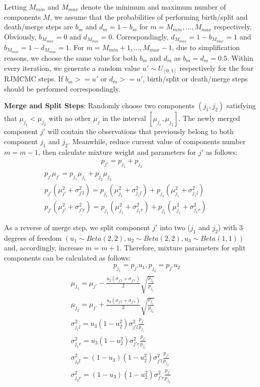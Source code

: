 \documentclass[conference]{IEEEtran}
\begin{document}
Letting $M_{min}$ and $M_{max}$ denote the minimum and maximum number of components $M$, we assume that the probabilities of performing birth/split and death/merge steps are $b_m$ and $d_m = 1 - b_m$ for $m = M_{min},\dots,M_{max}$ respectively. Obviously, $b_{M_{max}}=0$ and $d_{M_{min}}=0$. Correspondingly, $d_{M_{max}}=1-b_{M_{max}} = 1$ and $b_{M_{min}}=1-d_{M_{min}}=1$. For $m=M_{min}+1,\dots,M_{max}-1$, due to simplification reasons, we choose the same value for both $b_m$ and $d_m$ as $b_m=d_m=0.5$. Within every iteration, we generate a random value $u' \sim U_{[0,1]}$ respectively for the four RJMCMC steps. If $b_m >= u'$ or $d_m >= u'$, birth/split or death/merge steps should be performed correspondingly.\cite{Richardson1997}

\textbf{Merge and Split Steps}: Randomly choose two components $(j_1,j_2)$ satisfying that $\mu_{j_1}<\mu_{j_2}$ with no other $\mu_j$ in the interval $[\mu_{j_1},\mu_{j_2}]$. The newly merged component $j'$ will contain the observations that previously belong to both component $j_1$ and $j_2$. Meanwhile, reduce current value of components number $m=m-1$, then calculate mixture weight and parameters for $j'$ as follows:
\begin{multline}
\qquad\qquad\qquad\qquad p_{j'} = p_{j_1}+p_{j_2} \\
p_{j'}\mu_{j'} = p_{j_1}\mu_{j_1} + p_{j_2}\mu_{j_2} \\
p_{j'}(\mu_{j'}^2 + \sigma_{j'l}^2) = p_{j_1}(\mu_{j_1}^2 + \sigma_{j_1l}^2)+p_{j_1}(\mu_{j_1}^2 + \sigma_{j_1l}^2) \qquad \\
p_{j'}(\mu_{j'}^2 + \sigma_{j'r}^2) = p_{j_1}(\mu_{j_1}^2 + \sigma_{j_1r}^2)+p_{j_1}(\mu_{j_1}^2 + \sigma_{j_1r}^2)
\label{eq:merge}
\end{multline}

As a reverse of merge step, we split component $j'$ into two ($j_1$ and $j_2$) with 3 degrees of freedom $(u_1 \sim Beta(2,2), u_2 \sim Beta(2,2), u_3 \sim Beta(1,1))$ and, accordingly, increase $m=m+1$. Therefore, mixture parameters for split components can be calculated as follows:
\begin{multline}
\qquad\qquad\qquad p_{j_1} = p_{j'}u_1, p_{j_2} = p_{j'}u_2 \\
\mu_{j_1} = \mu_{j'} - \frac{u_2(\sigma_{j'l}+\sigma_{j'r})}{2} \sqrt{\frac{p_{j_2}}{p_{j_1}}} \\
\mu_{j_2} = \mu_{j'} + \frac{u_2(\sigma_{j'l}+\sigma_{j'r})}{2} \sqrt{\frac{p_{j_1}}{p_{j_2}}} \\
\sigma_{j_1l}^2 = u_3(1-u_2^2)\sigma_{j'l}^2\frac{p_{j'}}{p_{j_1}} \\
\sigma_{j_1r}^2 = u_3(1-u_2^2)\sigma_{j'r}^2\frac{p_{j'}}{p_{j_1}} \\
\sigma_{j_2l}^2 = (1-u_3)(1-u_2^2)\sigma_{j'l}^2\frac{p_{j'}}{p_{j_2}} \\
\sigma_{j_2r}^2 = (1-u_3)(1-u_2^2)\sigma_{j'r}^2\frac{p_{j'}}{p_{j_2}} \qquad\quad
\label{eq:split}
\end{multline}
\end{document}
